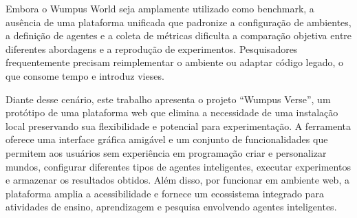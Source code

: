 Embora o Wumpus World seja amplamente utilizado como benchmark, a ausência de uma plataforma unificada que padronize a configuração de ambientes, a definição de agentes e a coleta de métricas dificulta a comparação objetiva entre diferentes abordagens e a reprodução de experimentos. Pesquisadores frequentemente precisam reimplementar o ambiente ou adaptar código legado, o que consome tempo e introduz vieses.

Diante desse cenário, este trabalho apresenta o projeto “Wumpus Verse”, um protótipo de uma plataforma web que elimina a necessidade de uma instalação local preservando sua flexibilidade e potencial para experimentação. A ferramenta oferece uma interface gráfica amigável e um conjunto de funcionalidades que permitem aos usuários sem experiência em programação criar e personalizar mundos, configurar diferentes tipos de agentes inteligentes, executar experimentos e armazenar os resultados obtidos. Além disso, por funcionar em ambiente web, a plataforma amplia a acessibilidade e fornece um ecossistema integrado para atividades de ensino, aprendizagem e pesquisa envolvendo agentes inteligentes.